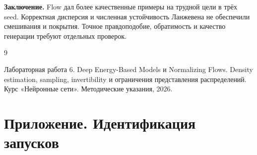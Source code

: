 \noindent\textbf{Заключение.} Flow дал более качественные примеры на трудной цели в трёх seed. Корректная дисперсия и численная устойчивость Ланжевена не обеспечили смешивания и покрытия. Точное правдоподобие, обратимость и качество генерации требуют отдельных проверок.
\clearpage
\renewcommand{\refname}{Список использованных источников}
\begin{thebibliography}{9}
 Лабораторная работа 6. Deep Energy-Based Models и Normalizing Flows. Density estimation, sampling, invertibility и ограничения представления распределений. Курс «Нейронные сети». Методические указания, 2026.
\end{thebibliography}
\clearpage
\section*{Приложение. Идентификация запусков}
\begingroup\small{}
